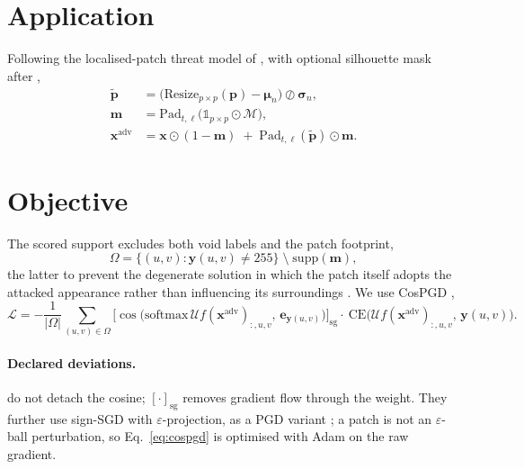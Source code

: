 \documentclass[11pt,a4paper]{article}
\begin{document}
\section{Application}

Following the localised-patch threat model of \citet{brown2017patch},
with optional silhouette mask after \citet{tan2021lap},
\begin{align}
  \tilde{\mathbf{p}} &= \big(\mathrm{Resize}_{p\times p}(\mathbf{p})
    -\boldsymbol{\mu}_n\big)\oslash\boldsymbol{\sigma}_n, \\
  \mathbf{m} &= \mathrm{Pad}_{t,\ell}\big(\mathbb{1}_{p\times p}\odot\mathcal{M}\big), \\
  \mathbf{x}^{\mathrm{adv}} &= \mathbf{x}\odot(1-\mathbf{m})
    \;+\;\mathrm{Pad}_{t,\ell}(\tilde{\mathbf{p}})\odot\mathbf{m}.
  \label{eq:apply}
\end{align}

\section{Objective}

The scored support excludes both void labels and the patch footprint,
\begin{equation}
  \Omega=\{(u,v):\mathbf{y}(u,v)\neq255\}\;\setminus\;\mathrm{supp}(\mathbf{m}),
  \label{eq:support}
\end{equation}
the latter to prevent the degenerate solution in which the patch itself
adopts the attacked appearance rather than influencing its surroundings
\citep{mirsky2023ipatch}. We use CosPGD \citep{agnihotri2024cospgd},
\begin{equation}
  \mathcal{L}=-\frac{1}{|\Omega|}\sum_{(u,v)\in\Omega}
  \Big[\cos\big(\mathrm{softmax}\,\mathcal{U}f(\mathbf{x}^{\mathrm{adv}})_{:,u,v},\,
  \mathbf{e}_{\mathbf{y}(u,v)}\big)\Big]_{\mathrm{sg}}
  \cdot\ \mathrm{CE}\big(\mathcal{U}f(\mathbf{x}^{\mathrm{adv}})_{:,u,v},\,
  \mathbf{y}(u,v)\big).
  \label{eq:cospgd}
\end{equation}

\paragraph{Declared deviations.}
\citet{agnihotri2024cospgd} do not detach the cosine;
$[\cdot]_{\mathrm{sg}}$ removes gradient flow through the weight. They
further use sign-SGD with $\varepsilon$-projection, as a PGD variant
\citep{madry2018pgd}; a patch is not an $\varepsilon$-ball
perturbation, so Eq.~\eqref{eq:cospgd} is optimised with Adam
\citep{kingma2015adam} on the raw gradient.
\end{document}
